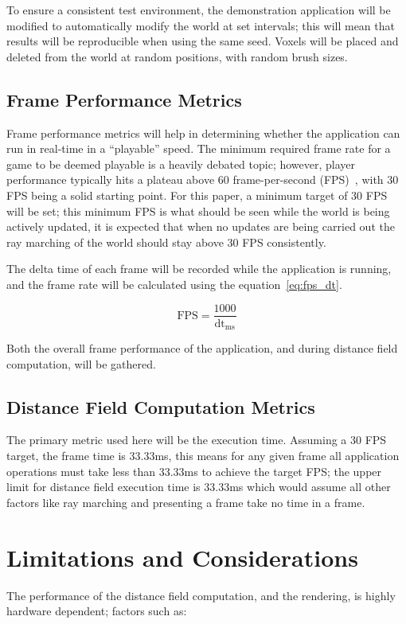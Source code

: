 To ensure a consistent test environment, the demonstration application will be modified to automatically modify the
world at set intervals; this will mean that results will be reproducible when using the same seed. Voxels will be placed
and deleted from the world at random positions, with random brush sizes.

\subsection{Frame Performance Metrics}\label{sec:frame_perf_metrics}
Frame performance metrics will help in determining whether the application can run in real-time in a ``playable'' speed.
The minimum required frame rate for a game to be deemed playable is a heavily debated topic; however, player performance
typically hits a plateau above 60 frame-per-second (FPS)~\cite{claypool2007frame}, with 30 FPS being a solid starting
point. For this paper, a minimum target of 30 FPS will be set; this minimum FPS is what should be seen while the world
is being actively updated, it is expected that when no updates are being carried out the ray marching of the world should
stay above 30 FPS consistently.

The delta time of each frame will be recorded while the application is running, and the frame rate will be calculated
using the equation~\ref{eq:fps_dt}.

\begin{equation}\label{eq:fps_dt}
    \text{FPS} = \frac{1000}{\text{dt}_{\text{ms}}}
\end{equation}

Both the overall frame performance of the application, and during distance field computation, will be gathered.

\subsection{Distance Field Computation Metrics}\label{sec:distance_field_metrics}
The primary metric used here will be the execution time. Assuming a 30 FPS target, the frame time is 33.33ms, this means
for any given frame all application operations must take less than 33.33ms to achieve the target FPS; the upper
limit for distance field execution time is 33.33ms which would assume all other factors like ray marching and
presenting a frame take no time in a frame.

\break

\section{Limitations and Considerations}
The performance of the distance field computation, and the rendering, is highly hardware dependent; factors such as:

